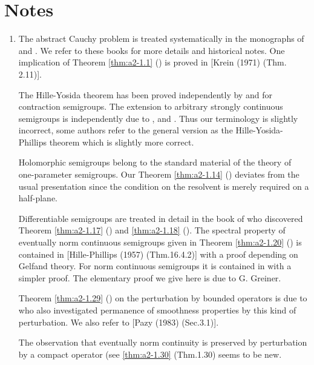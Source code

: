 \section*{Notes}\label{notes:d4-notes}
\begin{enumerate}[label=\emph{Section \arabic*:}, wide, labelindent=0.0em]
\item
The abstract Cauchy problem is treated systematically in the monographs of \citet{krein:1971} and \citet{fattorini:1983}.
We refer to these books for more details and historical notes.
One implication of Theorem \ref{thm:a2-1.1} () is proved in [Krein (1971) (Thm. 2.11)].

The Hille-Yosida theorem has been proved independently by \citet{hille:1948} and \citet{yosida:1948} for contraction semigroups.
The extension to arbitrary strongly continuous semigroups is independently due to \citet{feller:1953}, \citet{miyadera:1952} and \citet{phillips:1953}.
Thus our terminology is slightly incorrect, some authors refer to the general version as the Hille-Yosida-Phillips theorem which is slightly more correct.

Holomorphic semigroups belong to the standard material of the theory of one-parameter semigroups.
Our Theorem \ref{thm:a2-1.14} () deviates from the usual presentation since the condition on the resolvent is merely required on a half-plane.

Differentiable semigroups are treated in detail in the book of \citet{pazy:1983} who discovered Theorem \ref{thm:a2-1.17} () and \ref{thm:a2-1.18} ().
The spectral property of eventually norm continuous semigroups given in Theorem \ref{thm:a2-1.20} () is contained in [Hille-Phillips (1957) (Thm.16.4.2)] with a proof depending on Gelfand theory.
For norm continuous semigroups it is contained in \citet{pazy:1983} with a simpler proof.
The elementary proof we give here is due to G. Greiner.

Theorem \ref{thm:a2-1.29} () on the perturbation by bounded operators is due to \citet{phillips:1953} who also investigated permanence of smoothness properties by this kind of perturbation.
We also refer to [Pazy (1983) (Sec.3.1)].

The observation that eventually norm continuity is preserved by perturbation by a compact operator (see \ref{thm:a2-1.30} (\lnm Thm.1.30) seems to be new.


\end{enumerate}
